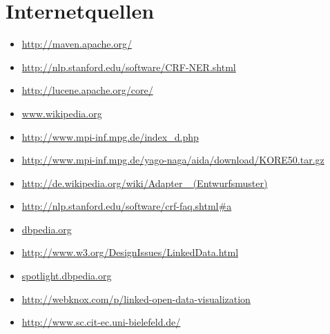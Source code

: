\documentclass[11pt, a4paper, oneside]{Thesis} %
\begin{document}




\section*{Internetquellen}
\begin{itemize}
\item \url{http://maven.apache.org/}
\item \url{http://nlp.stanford.edu/software/CRF-NER.shtml}
\item \url{http://lucene.apache.org/core/}
\item \url{www.wikipedia.org}
\item \url{http://www.mpi-inf.mpg.de/index\_d.php}
\item \url{http://www.mpi-inf.mpg.de/yago-naga/aida/download/KORE50.tar.gz}
\item \url{http://de.wikipedia.org/wiki/Adapter
\_(Entwurfsmuster)}
\item \url{http://nlp.stanford.edu/software/crf-faq.shtml\#a}
\item \url{dbpedia.org}
\item \url{http://www.w3.org/DesignIssues/LinkedData.html}
\item \url{spotlight.dbpedia.org}
\item \url{http://webknox.com/p/linked-open-data-visualization}
\item \url{http://www.sc.cit-ec.uni-bielefeld.de/}
\end{itemize}
\end{document}
